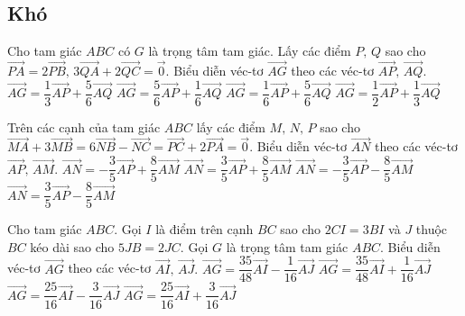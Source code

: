 \subsection*{Khó}
\begin{ex}%
	Cho tam giác $ABC$ có $G$ là trọng tâm tam giác. Lấy các điểm $P,\,Q$ sao cho $\vec{PA}=2\vec{PB},\,3\vec{QA}+2\vec{QC}=\vec{0}$. Biểu diễn véc-tơ $\vec{AG}$ theo các véc-tơ $\vec{AP},\,\vec{AQ}.$
	\choice
	{$\vec{AG}=\dfrac{1}{3}\vec{AP}+\dfrac{5}{6}\vec{AQ}$}
	{$\vec{AG}=\dfrac{5}{6}\vec{AP}+\dfrac{1}{6}\vec{AQ}$}
	{\True $\vec{AG}=\dfrac{1}{6}\vec{AP}+\dfrac{5}{6}\vec{AQ}$}
	{$\vec{AG}=\dfrac{1}{2}\vec{AP}+\dfrac{1}{3}\vec{AQ}$}
\end{ex}

\begin{ex}%
	Trên các cạnh của tam giác $ABC$ lấy các điểm $M,\,N,\,P$ sao cho $\vec{MA}+3\vec{MB}=6\vec{NB}-\vec{NC}=\vec{PC}+2\vec{PA}=\vec{0}$. Biểu diễn véc-tơ $\vec{AN}$ theo các véc-tơ $\vec{AP},\,\vec{AM}.$
	\haicot
	{\True $\vec{AN}=-\dfrac{3}{5}\vec{AP}+\dfrac{8}{5}\vec{AM}$}
	{$\vec{AN}=\dfrac{3}{5}\vec{AP}+\dfrac{8}{5}\vec{AM}$}
	{$\vec{AN}=-\dfrac{3}{5}\vec{AP}-\dfrac{8}{5}\vec{AM}$}
	{$\vec{AN}=\dfrac{3}{5}\vec{AP}-\dfrac{8}{5}\vec{AM}$}
\end{ex}

\begin{ex}%
	Cho tam giác $ABC$. Gọi $I$ là điểm trên cạnh $BC$ sao cho $2CI=3BI$ và $J$ thuộc $BC$ kéo dài sao cho $5JB=2JC$. Gọi $G$ là trọng tâm tam giác $ABC$. Biểu diễn véc-tơ $\vec{AG}$ theo các véc-tơ $\vec{AI},\,\vec{AJ}.$
	\choice
	{\True $\vec{AG}=\dfrac{35}{48}\vec{AI}-\dfrac{1}{16}\vec{AJ}$}
	{$\vec{AG}=\dfrac{35}{48}\vec{AI}+\dfrac{1}{16}\vec{AJ}$}
	{$\vec{AG}=\dfrac{25}{16}\vec{AI}-\dfrac{3}{16}\vec{AJ}$}
	{$\vec{AG}=\dfrac{25}{16}\vec{AI}+\dfrac{3}{16}\vec{AJ}$}
\end{ex}

